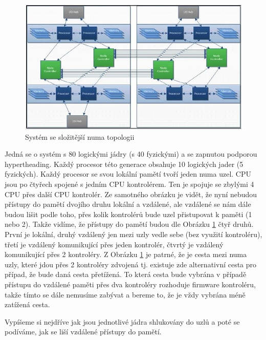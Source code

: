 \documentclass[
  field=ainfk,
  biblatex,
  glossaries,
  index
]{kidiplom}
\begin{document}
\begin{figure}[ht]
\includegraphics[scale=0.7]{obrazky/numa-scheme-big-system.jpeg}
\caption{Systém se složitější numa topologii}
\label{numa scheme2}
\end{figure}


Jedná se o systém s 80 logickými jádry (s 40 fyzickými) a se zapnutou podporou hypertheading. Každý procesor této generace obsahuje 10 logických jader (5 fyzických). Každý procesor se svou lokální pamětí tvoří jeden numa uzel. CPU jsou po čtyřech spojené s jedním CPU kontrolérem. Ten je spojuje se zbylými 4 CPU přes další CPU kontrolér. Ze samotného obrázku je vidět, že nyní nebudou přístupy do pamětí dvojího druhu lokální a vzdálené, ale vzdálené se nám dále budou lišit podle toho, přes kolik kontrolérů bude uzel přistupovat k paměti (1 nebo 2). Takže vidíme, že přístupy do pamětí budou dle Obrázku \ref{numa scheme2} čtyř druhů. První je lokální, druhý vzdálený jen mezi uzly vedle sebe (bez využití kontroléru), třetí je vzdálený komunikující přes jeden kontrolér, čtvrtý je vzdálený komunikující přes 2 kontroléry. Z Obrázku \ref{numa scheme2} je patrné, že je cesta mezi numa uzly, které jdou přes 2 kontroléry zdvojená tj. existuje zde alternativní cesta pro případ, že bude daná cesta přetížená. To která cesta bude vybrána v případě přístupu do vzdálené paměti přes dva kontroléry rozhoduje firmware kontroléru, takže tímto se dále nemusíme zabývat a bereme to, že je vždy vybrána méně zatížená cesta.

\newpage
Vypíšeme si nejdříve jak jsou jednotlivé jádra shlukovány do uzlů a poté se podíváme, jak se liší vzdálené přístupy do pamětí.
\end{document}
